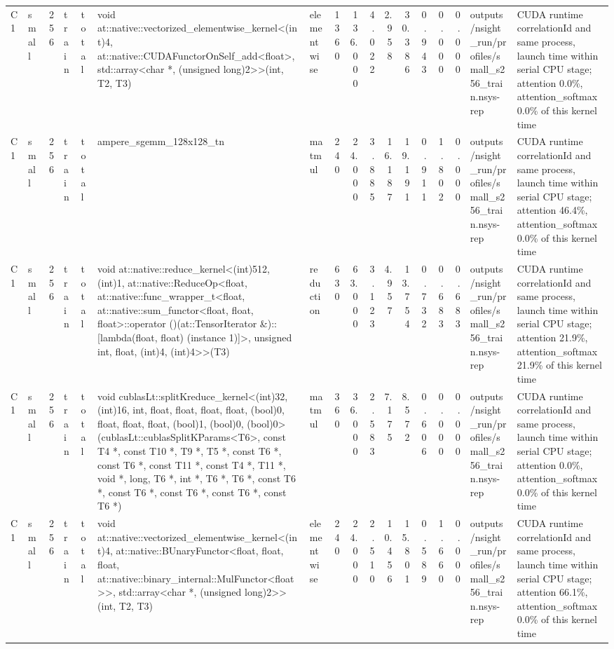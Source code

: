 \begin{tabular}{llrllllrrrrrrrrll}
C1 & small & 256 & train & total & void at::native::vectorized\_elementwise\_kernel<(int)4, at::native::CUDAFunctorOnSelf\_add<float>, std::array<char *, (unsigned long)2>>(int, T2, T3) & elementwise & 1360 & 136.000 & 4.022 & 2.958 & 30.386 & 0.943 & 0.000 & 0.000 & outputs/nsight\_run/profiles/small\_s256\_train.nsys-rep & CUDA runtime correlationId and same process, launch time within serial CPU stage; attention 0.0\%, attention\_softmax 0.0\% of this kernel time \\
C1 & small & 256 & train & total & ampere\_sgemm\_128x128\_tn & matmul & 240 & 24.000 & 3.885 & 16.187 & 19.191 & 0.911 & 1.802 & 0.000 & outputs/nsight\_run/profiles/small\_s256\_train.nsys-rep & CUDA runtime correlationId and same process, launch time within serial CPU stage; attention 46.4\%, attention\_softmax 0.0\% of this kernel time \\
C1 & small & 256 & train & total & void at::native::reduce\_kernel<(int)512, (int)1, at::native::ReduceOp<float, at::native::func\_wrapper\_t<float, at::native::sum\_functor<float, float, float>::operator ()(at::TensorIterator \&)::[lambda(float, float) (instance 1)]>, unsigned int, float, (int)4, (int)4>>(T3) & reduction & 630 & 63.000 & 3.123 & 4.957 & 13.754 & 0.732 & 0.683 & 0.683 & outputs/nsight\_run/profiles/small\_s256\_train.nsys-rep & CUDA runtime correlationId and same process, launch time within serial CPU stage; attention 21.9\%, attention\_softmax 21.9\% of this kernel time \\
C1 & small & 256 & train & total & void cublasLt::splitKreduce\_kernel<(int)32, (int)16, int, float, float, float, float, (bool)0, float, float, float, (bool)1, (bool)0, (bool)0>(cublasLt::cublasSplitKParams<T6>, const T4 *, const T10 *, T9 *, T5 *, const T6 *, const T6 *, const T11 *, const T4 *, T11 *, void *, long, T6 *, int *, T6 *, T6 *, const T6 *, const T6 *, const T6 *, const T6 *, const T6 *) & matmul & 360 & 36.000 & 2.583 & 7.175 & 8.572 & 0.606 & 0.000 & 0.000 & outputs/nsight\_run/profiles/small\_s256\_train.nsys-rep & CUDA runtime correlationId and same process, launch time within serial CPU stage; attention 0.0\%, attention\_softmax 0.0\% of this kernel time \\
C1 & small & 256 & train & total & void at::native::vectorized\_elementwise\_kernel<(int)4, at::native::BUnaryFunctor<float, float, float, at::native::binary\_internal::MulFunctor<float>>, std::array<char *, (unsigned long)2>>(int, T2, T3) & elementwise & 240 & 24.000 & 2.510 & 10.456 & 15.801 & 0.589 & 1.660 & 0.000 & outputs/nsight\_run/profiles/small\_s256\_train.nsys-rep & CUDA runtime correlationId and same process, launch time within serial CPU stage; attention 66.1\%, attention\_softmax 0.0\% of this kernel time \\

\end{tabular}
